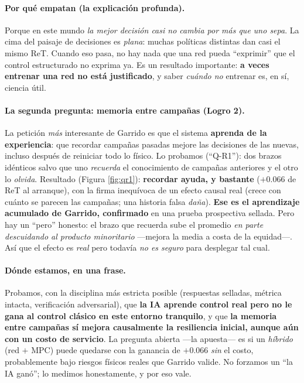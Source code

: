 \documentclass[11pt,a4paper]{article}
\begin{document}
\paragraph{Por qué empatan (la explicación profunda).} Porque en este mundo \emph{la mejor decisión
casi no cambia por más que uno sepa}. La cima del paisaje de decisiones es \emph{plana}: muchas
políticas distintas dan casi el mismo ReT. Cuando eso pasa, no hay nada que una red pueda ``exprimir''
que el control estructurado no exprima ya. Es un resultado importante: \textbf{a veces entrenar una red
no está justificado}, y saber \emph{cuándo no} entrenar es, en sí, ciencia útil.

\paragraph{La segunda pregunta: memoria entre campañas (Logro 2).} La petición \emph{más} interesante de
Garrido es que el sistema \textbf{aprenda de la experiencia}: que recordar campañas pasadas mejore las
decisiones de las nuevas, incluso después de reiniciar todo lo físico. Lo probamos (``Q-R1''): dos
brazos idénticos salvo que uno \emph{recuerda} el conocimiento de campañas anteriores y el otro lo
\emph{olvida}. Resultado (Figura \ref{fig:qr1}): \textbf{recordar ayuda, y bastante} ($+0.066$ de ReT al
arranque), con la firma inequívoca de un efecto causal real (crece con cuánto se parecen las campañas;
una historia falsa \emph{daña}). \textbf{Ese es el aprendizaje acumulado de Garrido, confirmado} en una
prueba prospectiva sellada. Pero hay un ``pero'' honesto: el brazo que recuerda sube el promedio
\emph{en parte descuidando al producto minoritario} —mejora la media a costa de la equidad—. Así que el
efecto es \emph{real} pero todavía \emph{no es seguro} para desplegar tal cual.

\paragraph{Dónde estamos, en una frase.} Probamos, con la disciplina más estricta posible (respuestas
selladas, métrica intacta, verificación adversarial), que \textbf{la IA aprende control real pero no le
gana al control clásico en este entorno tranquilo}, y que \textbf{la memoria entre campañas sí mejora
causalmente la resiliencia inicial, aunque aún con un costo de servicio}. La pregunta abierta —la
apuesta— es si un \emph{híbrido} (red $+$ MPC) puede quedarse con la ganancia de $+0.066$ \emph{sin} el
costo, probablemente bajo riesgos físicos reales que Garrido valide. No forzamos un ``la IA ganó''; lo
medimos honestamente, y por eso vale.
\end{document}
